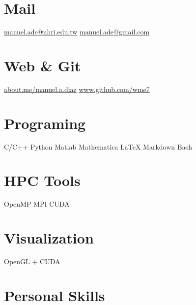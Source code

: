 \documentclass[a4paper]{friggeri-cv}
\begin{document}
\begin{aside}
  \section{Mail}
    \href{mailto:manuel.ade@nhri.edu.tw}{manuel.ade@nhri.edu.tw}
    \href{mailto:manuel.ade@gmail.com}{manuel.ade@gmail.com}
    ~
  \section{Web \& Git}
    \href{https://about.me/manuel.a.diaz}{about.me/manuel.a.diaz}
    \href{http://www.github.com/wme7}{www.github.com/wme7}
    ~
  \section{Programing}
        C/C++
        Python
        Matlab
        Mathematica
        \LaTeX
        Markdown
        Bash
    ~
  \section{HPC Tools}
        OpenMP
        MPI
        CUDA
    ~
  \section{Visualization}
        OpenGL + CUDA
    ~
  \section{Personal Skills}
\end{aside}
\end{document}
